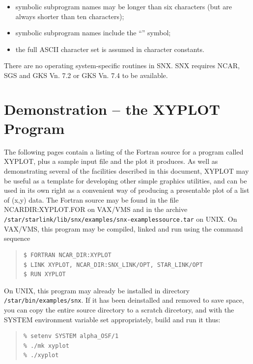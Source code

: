 \documentclass[twoside,11pt]{article}
\renewcommand{\_}{\texttt{\symbol{95}}}
\begin{document}
\begin {itemize}
\item symbolic subprogram names may be longer than six characters (but are 
always shorter than ten characters);
\item symbolic subprogram names include the ``\_'' symbol;
\item the full ASCII character set is assumed in character constants.
\end {itemize}

There are no operating system-specific routines in SNX.
SNX requires NCAR, SGS and GKS Vn. 7.2 or GKS Vn. 7.4 to be available.


\section {Demonstration -- the XYPLOT Program} \label{demo1_sect}
 
The following pages contain a listing of the Fortran source for a
program called XYPLOT, plus a sample input file and the plot it
produces.  As well as demonstrating several of the facilities described
in this document, XYPLOT may be useful as a template for developing
other simple graphics utilities, and can be used in its own right as a
convenient way of producing a presentable plot of a list of (x,y)
data.  The Fortran source may be found in the file NCAR\_DIR:XYPLOT.FOR
on VAX/VMS and in the archive {\tt
/star/\-starlink/\-lib/\-snx/\-examples/\-snx-examples\_source.tar} on
UNIX.  On VAX/VMS, this program may be compiled, linked and run using
the command sequence

\begin {quote}
\begin{verbatim}
$ FORTRAN NCAR_DIR:XYPLOT
$ LINK XYPLOT, NCAR_DIR:SNX_LINK/OPT, STAR_LINK/OPT
$ RUN XYPLOT
\end{verbatim}
\end {quote}

On UNIX, this program may already be installed in directory 
{\tt /star/bin/examples/snx}.  If it has been deinstalled and removed to save
space, you can copy the entire source directory to a scratch dircetory, and
with the SYSTEM environment variable set appropriately, build and run it thus:

\begin {quote}
\begin{verbatim}
% setenv SYSTEM alpha_OSF/1
% ./mk xyplot
% ./xyplot
\end{verbatim}
\end {quote}
\end{document}
